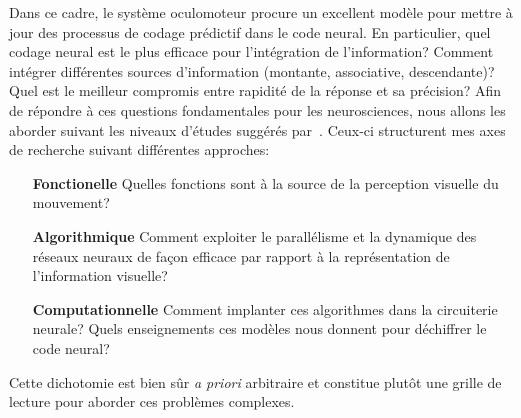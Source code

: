 \documentclass[11pt,french,a4paper,oneside]{article}%
\begin{document}
Dans ce cadre, le système oculomoteur procure un excellent modèle pour mettre à jour des processus de codage prédictif dans le code neural. En particulier, quel codage neural est le plus efficace pour l'intégration de l'information? Comment intégrer différentes sources d'information (montante, associative, descendante)? Quel est le meilleur compromis entre rapidité de la réponse et sa précision? %
%
Afin de répondre à ces questions fondamentales pour les neurosciences, nous allons les aborder suivant les niveaux d'études suggérés par~\citet{Marr83}. Ceux-ci structurent mes axes de recherche suivant différentes approches:
\begin{enumerate}
\item[\textbf{Fonctionelle}] Quelles fonctions sont à la source de %
la perception visuelle du mouvement?
\item[\textbf{Algorithmique}] Comment exploiter le parallélisme et la dynamique des réseaux neuraux de façon efficace par rapport à 
la représentation de l'information visuelle? %
\item[\textbf{Computationnelle}] Comment implanter ces algorithmes dans la circuiterie neurale? Quels enseignements ces modèles nous donnent pour déchiffrer le code neural?
\end{enumerate}
Cette dichotomie est bien sûr \emph{a priori} arbitraire et constitue plutôt une grille de lecture pour aborder ces problèmes complexes. %
\end{document}
